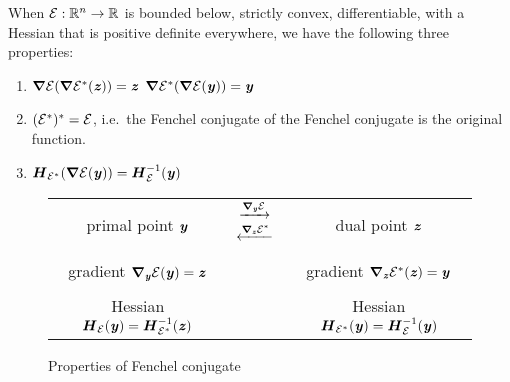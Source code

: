 \begin{theorem}
  \label{thm:conjugate}
  When $\calE : \R^n \to \R$ is bounded below, strictly convex, differentiable, with a Hessian
  that is positive definite everywhere, we have the following three properties:
  \begin{enumerate}
  \item $\grad\calE(\grad\calE^*(\zz))=\zz$  $\grad\calE^*(\grad\calE(\yy)) = \yy$ \label{enu:gradmap}
  \item $(\calE^*)^* = \calE$, i.e.\ the Fenchel conjugate of the \label{enu:doubleconj}
      Fenchel conjugate is the original function.
  \item $\HH_{\calE^*}(\grad\calE(\yy)) = \HH_{\calE}^{-1}(\yy)$ \label{enu:hessianmap}
  \end{enumerate}
\end{theorem}

\begin{figure}[H]
  \centering
\begin{center}
\begin{tabular}{ c c c }
 primal point $\yy$
  & $  \begin{matrix}
    \xrightarrow{\grad_{\yy} \calE }{} \\
     \xleftarrow{\grad_{\zz} \calE^* }{}
   \end{matrix}$ &
                   dual point $\zz$ \\
  \\
 gradient $\grad_{\yy} \calE(\yy) = \zz$  & & gradient $\grad_{\zz}
                                              \calE^*(\zz) = \yy$ \\
  \\
 Hessian $\HH_{\calE}(\yy) = \HH_{\calE^*}^{-1}(\zz) $ & & Hessian $\HH_{\calE^*}(\yy) = \HH_{\calE}^{-1}(\yy)$
\end{tabular}
\end{center}
  \caption{Properties of Fenchel conjugate}
  \label{fig:fenchel}
\end{figure}


